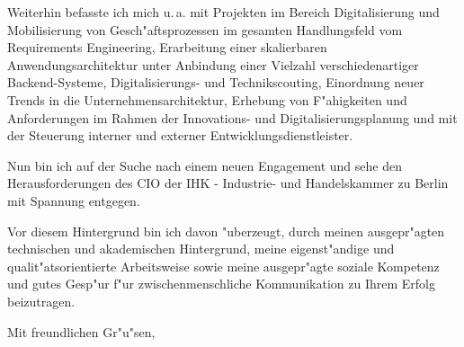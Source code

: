 \documentclass[11pt,a4paper]{dinbrief}
\begin{document}
\begin{letter}
Weiterhin befasste ich mich u.\,a. mit Projekten im Bereich Digitalisierung und Mobilisierung von Gesch"aftsprozessen im gesamten Handlungsfeld vom Requirements Engineering, Erarbeitung einer skalierbaren Anwendungsarchitektur unter Anbindung einer Vielzahl verschiedenartiger Backend-Systeme, Digitalisierungs- und Technikscouting, Einordnung neuer Trends in die Unternehmensarchitektur, Erhebung von F"ahigkeiten und Anforderungen im Rahmen der Innovations- und Digitalisierungsplanung und mit der Steuerung interner und externer Entwicklungsdienstleister. 

Nun bin ich auf der Suche nach einem neuen Engagement und sehe den Herausforderungen des CIO der IHK - Industrie- und Handelskammer zu Berlin mit Spannung entgegen.

Vor diesem Hintergrund bin ich davon "uberzeugt, durch meinen ausgepr"agten technischen und akademischen Hintergrund, meine eigenst"andige und qualit"atsorientierte Arbeitsweise sowie meine ausgepr"agte soziale Kompetenz und gutes Gesp"ur f"ur zwischenmenschliche Kommunikation zu Ihrem Erfolg beizutragen.

\closing{Mit freundlichen Gr"u"sen,}
\end{letter}
\end{document}
